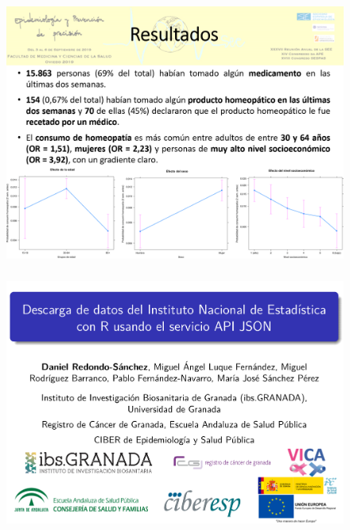 \documentclass{beamer}
\begin{document}
\begin{frame}\frametitle{}
	\begin{figure}
		\centering
		\includegraphics[width=.85\textwidth]{images/homeopatia2.png}
	\end{figure}
\end{frame}


\begin{frame}\frametitle{}
	\begin{figure}
		\centering
		\includegraphics[width=.8\textwidth]{images/INE_r.png}
	\end{figure}
\end{frame}

\end{document}
